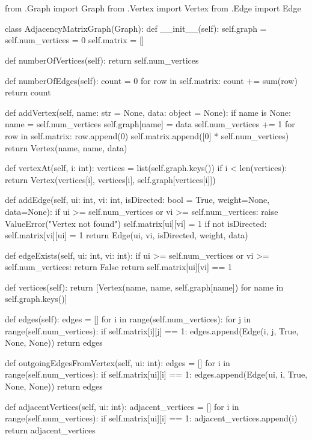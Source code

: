 \documentclass{article}
\begin{document}
\section{} %
\begin{python}
from .Graph import Graph
from .Vertex import Vertex
from .Edge import Edge



class AdjacencyMatrixGraph(Graph):
    def __init__(self):
        self.graph = {}
        self.num_vertices = 0
        self.matrix = []

    def numberOfVertices(self):
        return self.num_vertices

    def numberOfEdges(self):
        count = 0
        for row in self.matrix:
            count += sum(row)
        return count

    def addVertex(self, name: str = None, data: object = None):
        if name is None:
            name = self.num_vertices
        self.graph[name] = data
        self.num_vertices += 1
        for row in self.matrix:
            row.append(0)
        self.matrix.append([0] * self.num_vertices)
        return Vertex(name, name, data)

    def vertexAt(self, i: int):
        vertices = list(self.graph.keys())
        if i < len(vertices):
            return Vertex(vertices[i], vertices[i], self.graph[vertices[i]])

    def addEdge(self, ui: int, vi: int, isDirected: bool = True, weight=None, data=None):
        if ui >= self.num_vertices or vi >= self.num_vertices:
            raise ValueError("Vertex not found")
        self.matrix[ui][vi] = 1
        if not isDirected:
            self.matrix[vi][ui] = 1
        return Edge(ui, vi, isDirected, weight, data)

    def edgeExists(self, ui: int, vi: int):
        if ui >= self.num_vertices or vi >= self.num_vertices:
            return False
        return self.matrix[ui][vi] == 1

    def vertices(self):
        return [Vertex(name, name, self.graph[name]) for name in self.graph.keys()]

    def edges(self):
        edges = []
        for i in range(self.num_vertices):
            for j in range(self.num_vertices):
                if self.matrix[i][j] == 1:
                    edges.append(Edge(i, j, True, None, None))
        return edges

    def outgoingEdgesFromVertex(self, ui: int):
        edges = []
        for i in range(self.num_vertices):
            if self.matrix[ui][i] == 1:
                edges.append(Edge(ui, i, True, None, None))
        return edges

    def adjacentVertices(self, ui: int):
        adjacent_vertices = []
        for i in range(self.num_vertices):
            if self.matrix[ui][i] == 1:
                adjacent_vertices.append(i)
        return adjacent_vertices
\end{python}
\href{https://github.com/aejunior/bsi-ed-ii/blob/master/src/graph/amg.py}{\faGithub}
\end{document}
